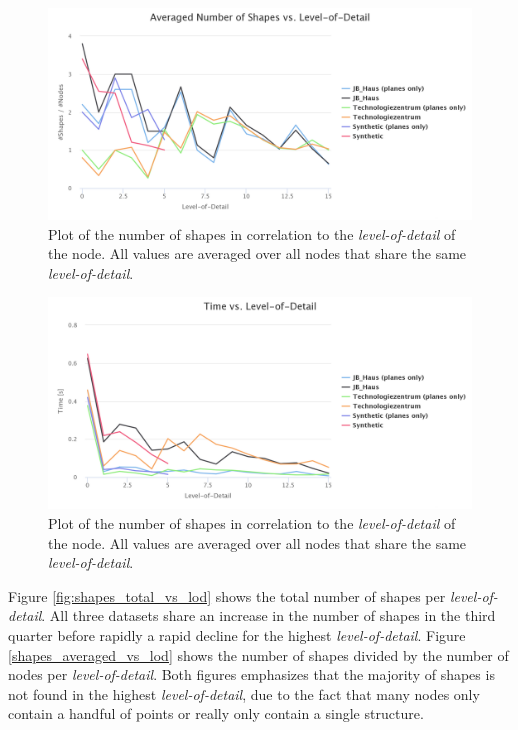 \begin{figure}[h]
    \centering
    \includegraphics[width=1\textwidth]{Results/shapes_averaged_vs_lod.png}
    \caption{Plot of the number of shapes in correlation to the \textit{level-of-detail} of the node. All values are averaged over all nodes that share the same \textit{level-of-detail}.}
    \label{fig:shapes_averaged_vs_lod}
\end{figure}

\begin{figure}[h]
    \centering
    \includegraphics[width=1\textwidth]{Results/time_vs_lod.png}
    \caption{Plot of the number of shapes in correlation to the \textit{level-of-detail} of the node. All values are averaged over all nodes that share the same \textit{level-of-detail}.}
    \label{fig:time_vs_lod}
\end{figure}


Figure \ref{fig:shapes_total_vs_lod} shows the total number of shapes per \textit{level-of-detail}. All three datasets share an increase in the number of shapes in the third quarter before rapidly a rapid decline for the highest \textit{level-of-detail}. Figure \ref{shapes_averaged_vs_lod} shows the number of shapes divided by the number of nodes per \textit{level-of-detail}. Both figures emphasizes that the majority of shapes is not found in the highest \textit{level-of-detail}, due to the fact that many nodes only contain a handful of points or really only contain a single structure. 
\\

